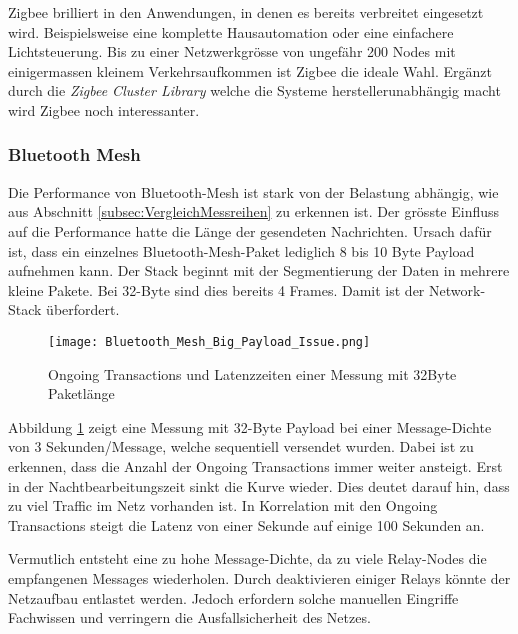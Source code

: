 Zigbee brilliert in den Anwendungen, in denen es bereits verbreitet eingesetzt wird.
Beispielsweise eine komplette Hausautomation oder eine einfachere Lichtsteuerung.
Bis zu einer Netzwerkgrösse von ungefähr 200 Nodes mit einigermassen kleinem Verkehrsaufkommen ist Zigbee die ideale Wahl.
Ergänzt durch die \textit{Zigbee Cluster Library} welche die Systeme herstellerunabhängig macht wird Zigbee noch interessanter.


\subsubsection{Bluetooth Mesh}\label{subsubsec:FazitBluetoothMesh}
Die Performance von Bluetooth-Mesh ist stark von der Belastung abhängig, wie aus Abschnitt \ref{subsec:VergleichMessreihen} zu erkennen ist.
Der grösste Einfluss auf die Performance hatte die Länge der gesendeten Nachrichten.
Ursach dafür ist, dass ein einzelnes Bluetooth-Mesh-Paket lediglich 8 bis 10 Byte Payload aufnehmen kann. Der Stack beginnt mit der Segmentierung der Daten in mehrere kleine Pakete. Bei 32-Byte sind dies bereits 4 Frames. Damit ist der Network-Stack überfordert. 

\begin{figure}[H]
	\centering
	\texttt{[image: Bluetooth\_Mesh\_Big\_Payload\_Issue.png]}
	\caption{Ongoing Transactions und Latenzzeiten einer Messung mit 32Byte Paketlänge}\label{fig:Bluetooth_Mesh_Big_Payload_Issue}
\end{figure}

Abbildung \ref{fig:Bluetooth_Mesh_Big_Payload_Issue} zeigt eine Messung mit 32-Byte Payload bei einer Message-Dichte von 3 Sekunden/Message, welche sequentiell versendet wurden.
Dabei ist zu erkennen, dass die Anzahl der Ongoing Transactions immer weiter ansteigt.
Erst in der Nachtbearbeitungszeit sinkt die Kurve wieder.
Dies deutet darauf hin, dass zu viel Traffic im Netz vorhanden ist. In Korrelation mit den Ongoing Transactions steigt die Latenz von einer Sekunde auf einige 100 Sekunden an.

Vermutlich entsteht eine zu hohe Message-Dichte, da zu viele Relay-Nodes die empfangenen Messages wiederholen. Durch deaktivieren einiger Relays könnte der Netzaufbau entlastet werden. Jedoch erfordern solche manuellen Eingriffe Fachwissen und verringern die Ausfallsicherheit des Netzes. 







